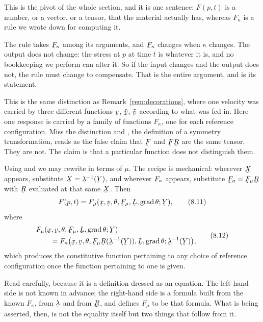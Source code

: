\begin{remark}\label{rem:ch8valfun}
This is the pivot of the whole section, and it is one sentence: $F(p,t)$
is a number, or a vector, or a tensor, that the material actually has,
whereas $F_{\kappa}$ is a rule we wrote down for computing it.

The rule takes $\bF_{\kappa}$ among its arguments, and $\bF_{\kappa}$
changes when $\kappa$ changes. The output does not change: the stress
at $p$ at time $t$ is whatever it is, and no bookkeeping we perform can
alter it. So if the input changes and the output does not, the rule must
change to compensate. That is the entire argument, and  is its
statement.

This is the same distinction as Remark~\ref{rem:decorations}, where one
velocity was carried by three different functions $\bv$, $\hat\bv$,
$\tilde\bv$ according to what was fed in. Here one response is carried
by a family of functions $F_{\kappa}$, one for each reference
configuration. Miss the distinction and , the definition of a
symmetry transformation, reads as the false claim that $\bF$ and
$\bF\bR$ are the same tensor. They are not. The claim is that a
particular function does not distinguish them.
\end{remark}

Using  and  we may rewrite  in terms of
$\mu$. The recipe is mechanical: wherever $\bX$ appears, substitute
$\bX=\vek{\lambda}^{-1}(\bY)$, and wherever $\bF_{\kappa}$ appears,
substitute $\bF_{\kappa}=\bF_{\mu}\bR$ with $\bR$ evaluated at that same
$\bX$. Then
\begin{equation}
   F(p,t)=F_{\mu}(\bx,\bv,\theta,\bF_{\mu},\bL,\grad\theta;\bY),
   \tag{8.11}\label{eq:8.11}
\end{equation}
where
\begin{equation}
\begin{aligned}
   &F_{\mu}(\bx,\bv,\theta,\bF_{\mu},\bL,\grad\theta;\bY)\\
   &\qquad=F_{\kappa}\big(\bx,\bv,\theta,
     \bF_{\mu}\bR(\vek{\lambda}^{-1}(\bY)),\bL,\grad\theta;
     \vek{\lambda}^{-1}(\bY)\big),
\end{aligned}
   \tag{8.12}\label{eq:8.12}
\end{equation}
which produces the constitutive function pertaining to any choice of
reference configuration once the function pertaining to one is given.

Read  carefully, because it is a definition dressed as an
equation. The left-hand side is not known in advance; the right-hand
side is a formula built from the known $F_{\kappa}$, from
$\vek{\lambda}$ and from $\bR$, and  defines $F_{\mu}$ to be
that formula. What is being asserted, then, is not the equality itself
but two things that follow from it.

